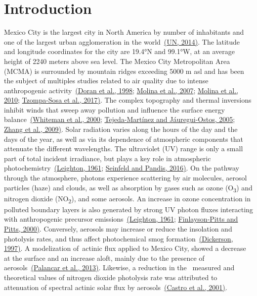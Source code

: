 \documentclass[10pt]{article}
\begin{document}
\sloppy




\section*{Introduction}

{\label{874460}}

Mexico City is the largest city in North America by number of
inhabitants and one of the largest urban agglomeration in the
world~\hyperref[csl:1]{(UN, 2014)}. The latitude and longitude coordinates for the
city are 19.4°N and 99.1°W, at an average height of 2240 meters above
sea level. The Mexico City Metropolitan Area (MCMA) is surrounded by
mountain ridges exceeding 5000 m asl and has been the subject of
multiples studies related to air quality due to intense anthropogenic
activity~\hyperref[csl:2]{(Doran et al., 1998}; \hyperref[csl:3]{Molina et al., 2007}; \hyperref[csl:4]{Molina et al., 2010}; \hyperref[csl:5]{Tzompa-Sosa et al., 2017)}. The complex topography and thermal
inversions inhibit winds that sweep away pollution and influence the
surface energy balance~\hyperref[csl:6]{(Whiteman et al., 2000}; \hyperref[csl:7]{Tejeda-Martínez and Jáuregui-Ostos, 2005}; \hyperref[csl:8]{Zhang et al., 2009)}. Solar radiation varies along
the hours of the day and the days of the year, as well as via its
dependence of atmospheric components that attenuate the different
wavelengths. The ultraviolet (UV) range is only a small part of total
incident irradiance, but plays a key role in atmospheric
photochemistry~\hyperref[csl:9]{(Leighton, 1961}; \hyperref[csl:10]{Seinfeld and Pandis, 2016)}. On the pathway through the
atmosphere, photons experience scattering by air molecules, aerosol
particles (haze) and clouds, as well as absorption by gases such as
ozone (O\textsubscript{3}) and nitrogen dioxide (NO\textsubscript{2}),
and some aerosols. An increase in ozone concentration in polluted
boundary layers is also generated by strong UV photon fluxes interacting
with anthropogenic precursor emissions~\hyperref[csl:9]{(Leighton, 1961}; \hyperref[csl:11]{Finlayson-Pitts and Pitts, 2000)}. Conversely,
aerosols may increase or reduce the insolation and photolysis rates, and
thus affect photochemical smog formation~\hyperref[csl:12]{(Dickerson, 1997)}. A
modelization of~actinic flux applied to Mexico City, showed a decrease
at the surface and an increase aloft, mainly due to the presence of
aerosols~\hyperref[csl:13]{(Palancar et al., 2013)}. Likewise, a reduction in the~ measured and
theoretical values of nitrogen dioxide photolysis rate was attributed to
attenuation of spectral actinic solar flux by
aerosols~\hyperref[csl:14]{(Castro et al., 2001)}.~
\end{document}
